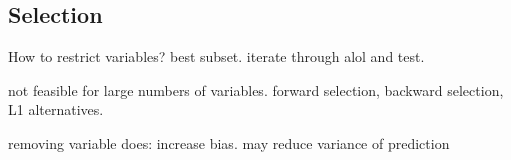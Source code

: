 
\subsection{Selection}

How to restrict variables? best subset. iterate through alol and test.

not feasible for large numbers of variables. forward selection, backward selection, L1 alternatives.

removing variable does: increase bias. may reduce variance of prediction

